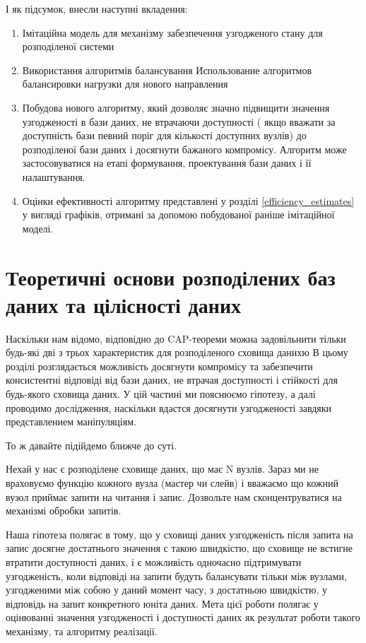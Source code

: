 \documentclass[14pt]{vakthesis}
\begin{document}
І як підсумок, внесли наступні вкладення:

\begin{enumerate}[widest=9999,itemindent=*,leftmargin=0pt]

\item Імітаційна модель для механізму забезпечення узгодженого стану для розподіленої системи
\item Використання алгоритмів балансування  Использование алгоритмов балансировки нагрузки для нового направления
\item Побудова нового алгоритму, який дозволяє значно підвищити значення узгодженості в бази даних, не втрачаючи доступності (
якщо вважати за доступність бази певний поріг для кількості доступних вузлів) до розподіленої бази даних і досягнути бажаного компромісу.
Алгоритм може застосовуватися на етапі формування, проектування бази даних і її налаштування.
\item Оцінки ефективності алгоритму представлені у розділі \ref{efficiency_estimates} у вигляді графіків, отримані за допомою побудованої раніше імітаційної моделі.

\end{enumerate}

\chapter{Теоретичні основи розподілених баз даних та цілісності даних}

Наскільки нам відомо, відповідно до CAP-теореми можна задовільнити тільки будь-які дві з трьох характеристик
для розподіленого сховища данихю
В цьому розділі розглядається можливість досягнути компромісу та забезпечити консистентні відповіді 
від бази даних, не втрачая доступності і стійкості для будь-якого сховища даних.
У цій частині ми пояснюємо гіпотезу, а далі проводимо дослідження, наскільки вдастся досягнути узгодженості завдяки
представлением маніпуляціям.

То ж давайте підійдемо ближче до суті.

Нехай у нас є розподілене сховище даних, що має N вузлів. Зараз ми не враховуємо функцію кожного вузла (мастер чи слейв) і 
вважаємо що кожний вузол приймає запити на читання і запис. Дозвольте нам сконцентруватися на механізмі обробки запитів.

Наша гіпотеза полягає в тому, що у сховищі даних узгодженість після запита на запис досягне достатнього значення с такою швидкістю, що сховище не встигне втратити доступності даних, і є можливість одночасно підтримувати узгодженість, коли відповіді на запити будуть балансувати тільки між вузлами, узгодженими між собою у даний момент часу, з достатньою швидкістю, у відповідь на запит конкретного юніта даних.
Мета цієї роботи полягає у оцінюванні значення узгодженості і доступності даних як результат роботи такого механізму, та алгоритму реалізації.
\end{document}
